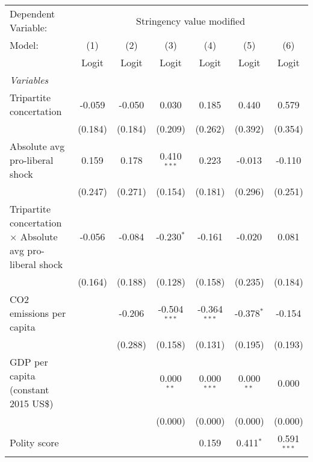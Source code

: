 
\begingroup
\centering
\begin{tabular}{lcccccc}
   \toprule
   Dependent Variable: & \multicolumn{6}{c}{Stringency value modified}\\
   Model:                                                           & (1)     & (2)     & (3)            & (4)            & (5)          & (6)\\  
                                                                    &  Logit  & Logit   & Logit          & Logit          & Logit        & Logit\\  
   \midrule
   \emph{Variables}\\
   Tripartite concertation                                          & -0.059  & -0.050  & 0.030          & 0.185          & 0.440        & 0.579\\   
                                                                    & (0.184) & (0.184) & (0.209)        & (0.262)        & (0.392)      & (0.354)\\   
   Absolute avg pro-liberal shock                                   & 0.159   & 0.178   & 0.410$^{***}$  & 0.223          & -0.013       & -0.110\\   
                                                                    & (0.247) & (0.271) & (0.154)        & (0.181)        & (0.296)      & (0.251)\\   
   Tripartite concertation $\times$ Absolute avg pro-liberal shock  & -0.056  & -0.084  & -0.230$^{*}$   & -0.161         & -0.020       & 0.081\\   
                                                                    & (0.164) & (0.188) & (0.128)        & (0.158)        & (0.235)      & (0.184)\\   
   CO2 emissions per capita                                         &         & -0.206  & -0.504$^{***}$ & -0.364$^{***}$ & -0.378$^{*}$ & -0.154\\   
                                                                    &         & (0.288) & (0.158)        & (0.131)        & (0.195)      & (0.193)\\   
   GDP per capita (constant 2015 US\$)                              &         &         & 0.000$^{**}$   & 0.000$^{***}$  & 0.000$^{**}$ & 0.000\\   
                                                                    &         &         & (0.000)        & (0.000)        & (0.000)      & (0.000)\\   
   Polity score                                                     &         &         &                & 0.159          & 0.411$^{*}$  & 0.591$^{***}$\\   

\end{tabular}
